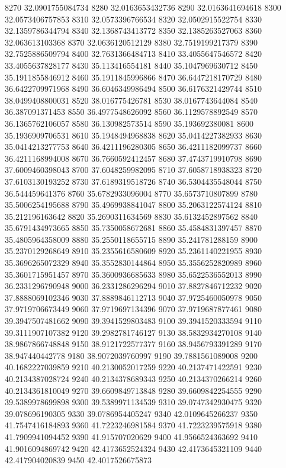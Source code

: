 {8270 32.0901755084734
8280 32.0163653432736
8290 32.0163641694618
8300 32.0573406757853
8310 32.0573396766534
8320 32.0502915522754
8330 32.1359786344794
8340 32.1368743413772
8350 32.1385263527063
8360 32.063613103368
8370 32.0636120512129
8380 32.7519199217379
8390 32.7525886509794
8400 32.7631366484713
8410 33.4055647546572
8420 33.4055637828177
8430 35.113416554181
8440 35.1047969630712
8450 35.1911855846912
8460 35.1911845996866
8470 36.6447218170729
8480 36.6422709971968
8490 36.6046349986494
8500 36.6176321429744
8510 38.0499408800031
8520 38.016775426781
8530 38.0167743644084
8540 36.387091371453
8550 36.4977548626092
8560 36.1129578892549
8570 36.1365762106057
8580 36.130982573514
8590 35.193692380081
8600 35.1936909706531
8610 35.1948494968838
8620 35.0414227382933
8630 35.0414213277753
8640 36.4211196280305
8650 36.4211182099737
8660 36.4211168994008
8670 36.7660592412457
8680 37.4743719910798
8690 37.6009460398043
8700 37.6048259982095
8710 37.6058718938323
8720 37.6103130193252
8730 37.6189319518726
8740 36.5304435548044
8750 36.544459641376
8760 35.6782933096004
8770 35.6573710807899
8780 35.5006254195688
8790 35.4969938841047
8800 35.2063122574124
8810 35.212196163642
8820 35.2690311634569
8830 35.6132452897562
8840 35.6791434973665
8850 35.7350058672681
8860 35.4584831397457
8870 35.4805964358009
8880 35.2550118655715
8890 35.241781288159
8900 35.2370129268649
8910 35.2355616580609
8920 35.2361140221955
8930 35.3696265072329
8940 35.3552830144864
8950 35.3556252820989
8960 35.3601715951457
8970 35.3600936685633
8980 35.6522536552013
8990 36.2331296790948
9000 36.2331286296294
9010 37.8827846712232
9020 37.8888069102346
9030 37.8889846112713
9040 37.9725460050978
9050 37.9719706673449
9060 37.9719697134396
9070 37.9719687877461
9080 39.3947507481662
9090 39.3941529803483
9100 39.3941520333594
9110 39.3111907107382
9120 39.2982781746127
9130 38.5832934270108
9140 38.9867866748848
9150 38.9121722577377
9160 38.9456793391289
9170 38.947440442778
9180 38.9072039760997
9190 39.7881561089008
9200 40.1682227039859
9210 40.2130052017259
9220 40.2137471422591
9230 40.2134387028724
9240 40.2134378689343
9250 40.2134370266214
9260 40.2134361810049
9270 39.6609849713848
9280 39.6609842254555
9290 39.5389978699898
9300 39.5389971134539
9310 39.0747342930475
9320 39.078696190305
9330 39.0786954405247
9340 42.0109645266237
9350 41.7547416184893
9360 41.7223246981584
9370 41.7223239575918
9380 41.7909941094452
9390 41.915707020629
9400 41.9566524363692
9410 41.9016094869742
9420 42.4173652524324
9430 42.4173645321109
9440 42.417904020839
9450 42.4017526675873
}

